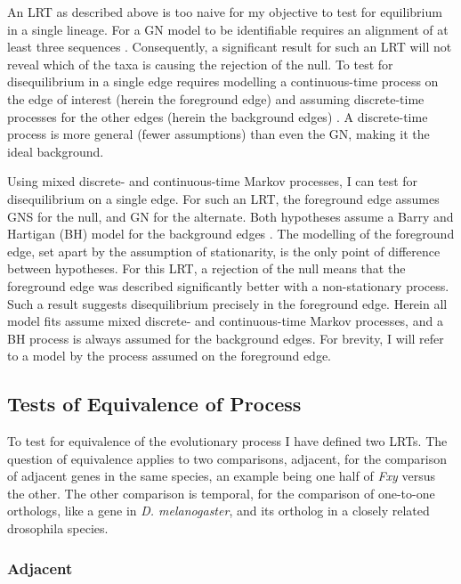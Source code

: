 An LRT as described above is too naive for my objective to test for equilibrium in a single lineage. For a GN model to be \gls{identifiable} requires an alignment of at least three sequences \citep{Chang1996FullConsistency}. Consequently, a significant result for such an LRT will not reveal which of the taxa is causing the rejection of the null. To test for disequilibrium in a single \gls{edge} requires  modelling a continuous-time process on the edge of interest (herein the foreground edge) and assuming discrete-time processes for the other edges (herein the background edges) \citep{Verbyla2013TheSubstitution}. A discrete-time process is more general (fewer assumptions) than even the GN, making it the ideal background.

Using mixed discrete- and continuous-time Markov processes, I can test for disequilibrium on a single edge. For such an LRT, the foreground edge assumes GNS for the null, and GN for the alternate. Both hypotheses assume a Barry and Hartigan (BH) model for the background edges \citep{Barry1987StatisticalEvolution}. The modelling of the foreground edge, set apart by the assumption of stationarity, is the only point of difference between hypotheses. For this LRT, a rejection of the null means that the foreground edge was described significantly better with a non-stationary process. Such a result suggests disequilibrium precisely in the foreground edge. Herein all model fits assume mixed discrete- and continuous-time Markov processes, and a BH process is always assumed for the background edges. For brevity, I will refer to a model by the process assumed on the foreground edge.

\subsection{Tests of Equivalence of Process}

To test for equivalence of the evolutionary process I have defined two LRTs. The question of equivalence applies to two comparisons, adjacent, for the comparison of adjacent genes in the same species, an example being one half of \textit{Fxy} versus the other. The other comparison is temporal, for the comparison of one-to-one orthologs, like a gene in \textit{D. melanogaster}, and its ortholog in a closely related drosophila species.

\subsubsection{Adjacent }


